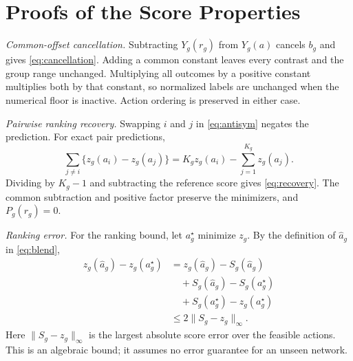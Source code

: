 \appendices
\section{Proofs of the Score Properties}
\label{app:score-proofs}

\emph{Common-offset cancellation.}
Subtracting $Y_g(r_g)$ from $Y_g(a)$ cancels $b_g$ and gives
\eqref{eq:cancellation}. Adding a common constant leaves every contrast and
the group range unchanged. Multiplying all outcomes by a positive constant
multiplies both by that constant, so normalized labels are unchanged when
the numerical floor is inactive. Action ordering is preserved in either case.

\emph{Pairwise ranking recovery.}
Swapping $i$ and $j$ in \eqref{eq:antisym} negates the prediction. For exact
pair predictions,
\begin{equation*}
 \sum_{j\ne i}\{z_g(a_i)-z_g(a_j)\}
 =K_gz_g(a_i)-\sum_{j=1}^{K_g}z_g(a_j).
\end{equation*}
Dividing by $K_g-1$ and subtracting the reference score gives
\eqref{eq:recovery}. The common subtraction and positive factor preserve
the minimizers, and $P_g(r_g)=0$.

\emph{Ranking error.}
For the ranking bound, let $a_g^\star$ minimize $z_g$. By the definition of
$\widehat a_g$ in \eqref{eq:blend},
\begin{align*}
 z_g(\widehat a_g)-z_g(a_g^\star)
 &=z_g(\widehat a_g)-S_g(\widehat a_g)\\
 &\quad+S_g(\widehat a_g)-S_g(a_g^\star)\\
 &\quad+S_g(a_g^\star)-z_g(a_g^\star)\\
 &\leq2\|S_g-z_g\|_\infty.
\end{align*}
Here $\|S_g-z_g\|_\infty$ is the largest absolute score error over the feasible
actions. This is an algebraic bound; it assumes no error guarantee for an
unseen network.
